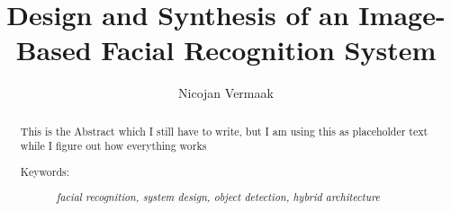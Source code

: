 \documentclass[a4paper, 12pt, notitlepage, draft]{report}
\title{Design and Synthesis of an Image-Based Facial Recognition System}
\author{Nicojan Vermaak}
\begin{document}
\renewcommand{\abstractname}{Acknowledgements}
\begin{abstract}
\thispagestyle{empty}
\noindent

\end{abstract}
\pagebreak
\renewcommand{\abstractname}{Abstract}
\begin{abstract}
\thispagestyle{empty}
\noindent
This is the Abstract which I still have to write, but I am using this as placeholder text while I figure out how everything works
\begin{description}
\item[Keywords:] \textit{facial recognition, system design, object detection, hybrid architecture}
\end{description}

\end{abstract}
\pagebreak
\renewcommand{\abstractname}{Opsomming}
\begin{abstract}
\thispagestyle{empty}
\noindent

\end{abstract}
\pagebreak
\tableofcontents

\listoffigures

\listoftables
\pagebreak



\end{document}
